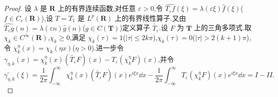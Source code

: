\begin{proof}
设 $\lambda$ 是 $\mathbf{R}$ 上的有界连续函数,对任意 $\varepsilon > 0$,令 $\widehat{T_{\varepsilon}f}(\xi) = \lambda(\varepsilon\xi)\widehat{f}(\xi)$($f \in C_c(\mathbf{R})$),设 $T = T_1$ 是 $L^p(\mathbf{R})$ 上的有界线性算子.又由 $\widehat{T_{\varepsilon}g}(n) = \lambda(\varepsilon n)\widehat{g}(n)$($g \in C(\mathbf{T})$)定义算子 $\widetilde{T_{\varepsilon}}$.设 $F$ 为 $\mathbf{T}$ 上的三角多项式.取 $\chi_k \in C^\infty(\mathbf{R})$,$\chi_k \geq 0$,满足 $\chi_k(\tau) = 1$($|\tau| \leq 2k\pi$),$\chi_k(\tau) = 0$($|\tau| > 2(k+1)\pi$),令 $\chi_k^\eta(x) = \chi_k(\eta x)$($\eta > 0$).进一步令 $\gamma_{\eta,k}(x) = \chi_k^\eta(x)(\widetilde{T_{\varepsilon}}F)(x) - T_{\varepsilon}(\chi_k^\eta F)(x)$,并令
\begin{equation*}
\widetilde{\gamma_{\eta,k}}(\xi) = \frac{1}{2\pi}\int_{-\infty}^{\infty}\chi_k^\eta(x)(\widetilde{T_{\varepsilon}}F)(x)e^{i\xi x}\dd x - \frac{1}{2\pi}\int_{-\infty}^{\infty}T_{\varepsilon}(\chi_k^\eta F)(x)e^{i\xi x}\dd x = I - II.
\end{equation*}


\end{proof}
